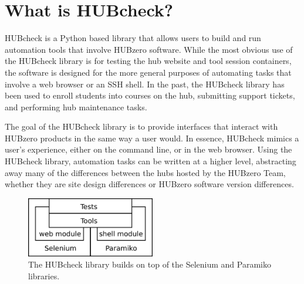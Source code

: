 

\section{What is HUBcheck?}
\label{sec:what_is_hubcheck}

HUBcheck is a Python based library that allows users to build and run
automation tools that involve HUBzero software. While the most obvious use of
the HUBcheck library is for testing the hub website and tool session
containers, the software is designed for the more general purposes of
automating tasks that involve a web browser or an SSH shell. In the past, the
HUBcheck library has been used to enroll students into courses on the hub,
submitting support tickets, and performing hub maintenance tasks.

The goal of the HUBcheck library is to provide interfaces that interact with
HUBzero products in the same way a user would. In essence, HUBcheck mimics
a user's experience, either on the command line, or in the web browser. Using
the HUBcheck library, automation tasks can be written at a higher level,
abstracting away many of the differences between the hubs hosted by the HUBzero
Team, whether they are site design differences or HUBzero software version
differences.

\begin{figure}[tbh]
  \centering
  \includegraphics[width=0.5\textwidth]
    {../../images/hubcheck_block_diagram/hubcheck_library_overview_base.png}
  \caption{ The HUBcheck library builds on top of the Selenium and Paramiko libraries. }
  \label{fig:hubzero_library_overview_base}
\end{figure}

